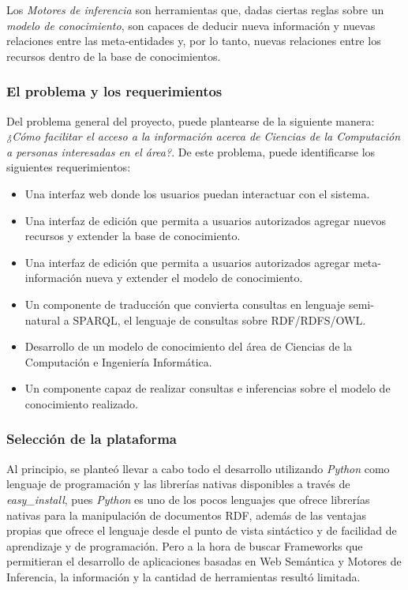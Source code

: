 Los \textit{Motores de inferencia} son herramientas que, dadas ciertas reglas sobre un \textit{modelo de conocimiento}, son capaces de deducir nueva información y nuevas relaciones entre las meta-entidades y, por lo tanto, nuevas relaciones entre los recursos dentro de la base de conocimientos.

\subsubsection{El problema y los requerimientos}
Del problema general del proyecto, puede plantearse de la siguiente manera: \textit{¿Cómo facilitar el acceso a la información acerca de Ciencias de la Computación a personas interesadas en el área?}. De este problema, puede identificarse los siguientes requerimientos:

\begin{itemize}
\item Una interfaz web donde los usuarios puedan interactuar con el sistema.
\item Una interfaz de edición que permita a usuarios autorizados agregar nuevos recursos y extender la base de conocimiento.
\item Una interfaz de edición que permita a usuarios autorizados agregar meta-información nueva y extender el modelo de conocimiento.
\item Un componente de traducción que convierta consultas en lenguaje semi-natural a SPARQL, el lenguaje de consultas sobre RDF/RDFS/OWL.
\item Desarrollo de un modelo de conocimiento del área de Ciencias de la Computación e Ingeniería Informática.
\item Un componente capaz de realizar consultas e inferencias sobre el modelo de conocimiento realizado.
\end{itemize}

\subsubsection{Selección de la plataforma}
Al principio, se planteó llevar a cabo todo el desarrollo utilizando \textit{Python} como lenguaje de programación y las librerías nativas disponibles a través de \textit{easy\_install}, pues \textit{Python} es uno de los pocos lenguajes que ofrece librerías nativas para la manipulación de documentos RDF, además de las ventajas propias que ofrece el lenguaje desde el punto de vista sintáctico y de facilidad de aprendizaje y de programación. Pero a la hora de buscar Frameworks que permitieran el desarrollo de aplicaciones basadas en Web Semántica y Motores de Inferencia, la información y la cantidad de herramientas resultó limitada.

